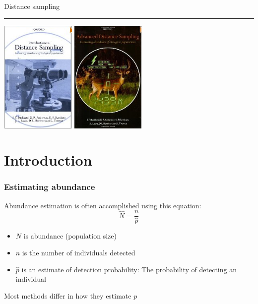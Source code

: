 \documentclass[color=usenames,dvipsnames]{beamer}\usepackage[]{graphicx}\usepackage[]{color}
\begin{document}
\begin{frame}[plain]
  \begin{center}
    {\huge Distance sampling \par}
    \vspace{0.5cm}
    {\color{RoyalBlue} \rule{\textwidth}{1pt}}
    \vfill
    \includegraphics[height=5.5cm,keepaspectratio]{figs/book1} %
    \hspace{0.5cm}
      \includegraphics[height=5.5cm,keepaspectratio,trim = 0mm
        0mm 0mm 0mm, clip]{figs/book2}
  \end{center}
\end{frame}




\section{Introduction}



\begin{frame}
  \frametitle{Estimating abundance}
  \large
  Abundance estimation is often accomplished using this equation:
  \[
    \hat{N} = \frac{n}{\hat{p}}
  \]
  \begin{itemize}
    \item $N$ is abundance (population size)
    \item $n$ is the number of individuals detected
    \item $\hat{p}$ is an estimate of detection probability: The probability
      of detecting an individual
  \end{itemize}
  \pause
  \vfill
  \centering
  Most methods differ in how they estimate $p$ \\
\end{frame}
\end{document}
